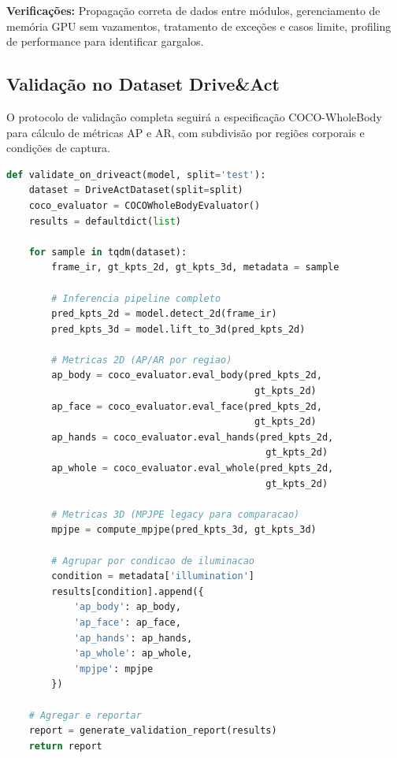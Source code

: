 \documentclass[12pt, a4paper]{article}
\begin{document}
\textbf{Verificações:} Propagação correta de dados entre módulos, gerenciamento de memória GPU sem vazamentos, tratamento de exceções e casos limite, profiling de performance para identificar gargalos.

\subsection{Validação no Dataset Drive\&Act}

O protocolo de validação completa seguirá a especificação COCO-WholeBody para cálculo de métricas AP e AR, com subdivisão por regiões corporais e condições de captura.

\begin{lstlisting}[language=Python, caption=Script de Validação com Métricas AP/AR]
def validate_on_driveact(model, split='test'):
    dataset = DriveActDataset(split=split)
    coco_evaluator = COCOWholeBodyEvaluator()
    results = defaultdict(list)
    
    for sample in tqdm(dataset):
        frame_ir, gt_kpts_2d, gt_kpts_3d, metadata = sample
        
        # Inferencia pipeline completo
        pred_kpts_2d = model.detect_2d(frame_ir)
        pred_kpts_3d = model.lift_to_3d(pred_kpts_2d)
        
        # Metricas 2D (AP/AR por regiao)
        ap_body = coco_evaluator.eval_body(pred_kpts_2d, 
                                            gt_kpts_2d)
        ap_face = coco_evaluator.eval_face(pred_kpts_2d, 
                                            gt_kpts_2d)
        ap_hands = coco_evaluator.eval_hands(pred_kpts_2d, 
                                              gt_kpts_2d)
        ap_whole = coco_evaluator.eval_whole(pred_kpts_2d, 
                                              gt_kpts_2d)
        
        # Metricas 3D (MPJPE legacy para comparacao)
        mpjpe = compute_mpjpe(pred_kpts_3d, gt_kpts_3d)
        
        # Agrupar por condicao de iluminacao
        condition = metadata['illumination']
        results[condition].append({
            'ap_body': ap_body,
            'ap_face': ap_face,
            'ap_hands': ap_hands,
            'ap_whole': ap_whole,
            'mpjpe': mpjpe
        })
    
    # Agregar e reportar
    report = generate_validation_report(results)
    return report
\end{lstlisting}
\end{document}
